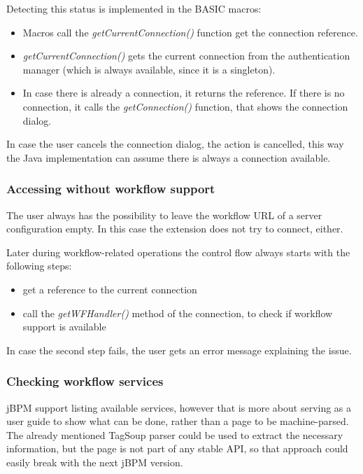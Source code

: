 Detecting this status is implemented in the BASIC macros:

\begin{itemize}
\item Macros call the \emph{getCurrentConnection()} function get the connection reference.
\item \emph{getCurrentConnection()} gets the current connection from the authentication manager (which is always available, since it is a singleton).
\item In case there is already a connection, it returns the reference. If there is no connection, it calls the \emph{getConnection()} function, that shows the connection dialog.
\end{itemize}

In case the user cancels the connection dialog, the action is cancelled, this
way the Java implementation can assume there is always a connection available.

\subsubsection*{Accessing without workflow support}

The user always has the possibility to leave the workflow URL of a server
configuration empty. In this case the extension does not try to connect,
either.

Later during workflow-related operations the control flow always starts with the following steps:

\begin{itemize}
\item get a reference to the current connection
\item call the \emph{getWFHandler()} method of the connection, to check if workflow support is available
\end{itemize}

In case the second step fails, the user gets an error message explaining the issue.

\subsubsection*{Checking workflow services}

jBPM support listing available services, however that is more about serving as
a user guide to show what can be done, rather than a page to be machine-parsed.
The already mentioned TagSoup parser could be used to extract the necessary
information, but the page is not part of any stable API, so that approach could
easily break with the next jBPM version.

